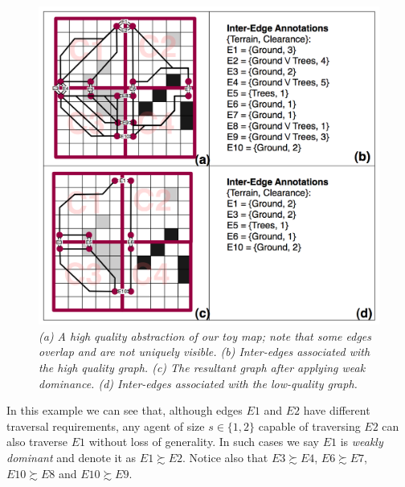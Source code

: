 \begin{figure}[htbp]
	\vspace{-9pt}
        \caption{\emph{(a) A high quality abstraction of our toy map; note that some edges overlap and are not uniquely visible. (b) Inter-edges associated with the high quality graph. (c) The resultant graph after applying weak dominance. (d) Inter-edges associated with the low-quality graph.}  \vspace{0.5em} }
        \begin{center}
                        \includegraphics[scale=0.25, trim = 20mm 12mm 20mm 0mm]{diagrams/abstraction_result.png}
        \end{center}
        \label{aha-fig:abstractgraph}
	\vspace{-10pt}
\end{figure}
In this example we can see that, although edges $E1$ and $E2$ have different traversal requirements, any agent of size $s \in \lbrace 1, 2 \rbrace$ capable of traversing $E2$ can also traverse $E1$ without loss of generality. 
In such cases we say $E1$ is \emph{weakly dominant} and denote it as $E1 \succsim E2$. 
Notice also that $E3 \succsim E4$, $E6 \succsim E7$, $E10 \succsim E8$ and $E10 \succsim E9$.
\par \indent
